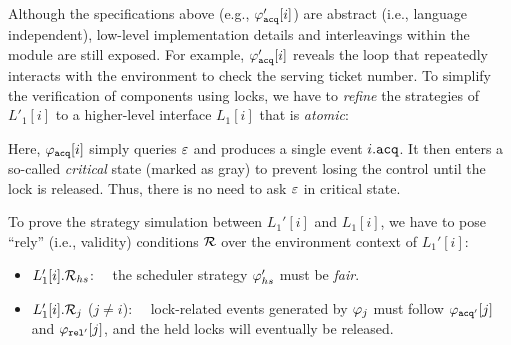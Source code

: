  Although the specifications above (e.g., $\varphi_{{\mathrm{\texttt{acq}}}}'[i]$) are abstract (i.e., language independent),
low-level implementation details and interleavings within the module are still exposed.
For example, $\varphi_{{\mathrm{\texttt{acq}}}}'[i]$ reveals the loop that repeatedly interacts with the environment to check the serving ticket number.
To simplify the verification of components using locks, we have to \emph{refine} the strategies of $L'_1[i]$ to a higher-level interface $L_1[i]$ that is \emph{atomic}:%
\begin{center}
\end{center}
Here, $\varphi_{{\mathrm{\texttt{acq}}}}[i]$ simply queries $\oracle$
and produces a single event $i.{\mathrm{\texttt{acq}}}$. It then enters  a so-called
\emph{critical} state (marked as gray) to prevent losing the control until  the lock is released. Thus, there is no need to  ask $\oracle$ in critical state. 

To prove the strategy simulation between $L_1'[i]$ and $L_1[i]$, we have to  pose ``rely'' (i.e.,
validity) conditions $\mathcal{R}$ over the environment context of $L_1'[i]$:

\begin{itemize}\itemsep1em
\item $L_1'[i].\mathcal{R}_{hs}$:~~  the scheduler strategy $\varphi_{hs}'$ must be \emph{fair}.
\item $L_1'[i].\mathcal{R}_{j}$ ($j\neq i$):~~ lock-related events 
 generated by $\varphi_{j}$ must follow $\varphi_{{\mathrm{\texttt{acq}}}'}[j]$ and $\varphi_{{\mathrm{\texttt{rel}}}'}[j]$, and the held locks will eventually be released.
\end{itemize}


